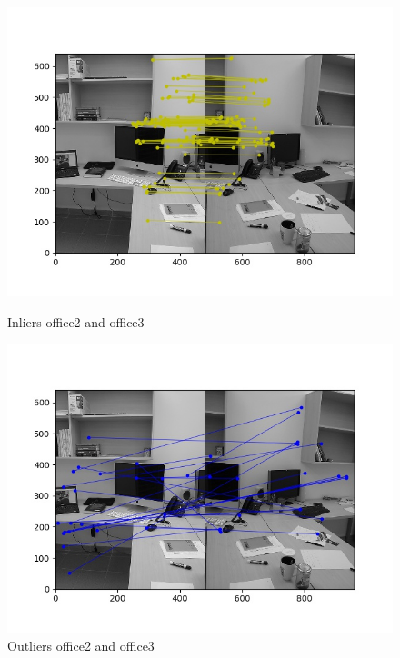 \documentclass[12pt,a4paper]{report}
\begin{document}
\begin{figure}[!htb]
  \includegraphics[width=\linewidth]{outMatches_inlier_office2}
        \caption{Inliers office2 and office3}
\endminipage\hfill
{}
  \includegraphics[width=\linewidth]{outMatches_outlier_office2}
        \caption{Outliers office2 and office3}
\endminipage\hfill
\end{figure}
\end{document}
